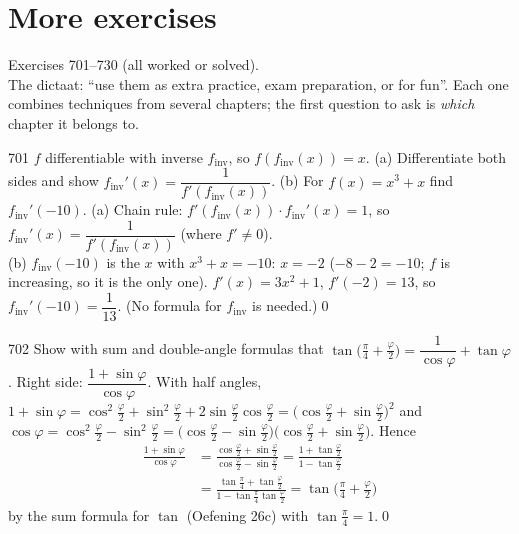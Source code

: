 \chapter{More exercises}
%
{Exercises 701--730 (all worked or solved).\\ The dictaat: ``use them as extra practice, exam preparation, or for fun''. Each one combines techniques from several chapters; the first question to ask is \emph{which} chapter it belongs to.}


\begin{bookex}{701}
$f$ differentiable with inverse $f_{\mathrm{inv}}$, so $f(f_{\mathrm{inv}}(x))=x$. (a) Differentiate both sides and show $f_{\mathrm{inv}}'(x)=\dfrac1{f'(f_{\mathrm{inv}}(x))}$. (b) For $f(x)=x^3+x$ find $f_{\mathrm{inv}}'(-10)$.
\solution
(a) Chain rule: $f'(f_{\mathrm{inv}}(x))\cdot f_{\mathrm{inv}}'(x)=1$, so $f_{\mathrm{inv}}'(x)=\dfrac1{f'(f_{\mathrm{inv}}(x))}$ (where $f'\ne0$).\\
(b) $f_{\mathrm{inv}}(-10)$ is the $x$ with $x^3+x=-10$: $x=-2$ ($-8-2=-10$; $f$ is increasing, so it is the only one). $f'(x)=3x^2+1$, $f'(-2)=13$, so $f_{\mathrm{inv}}'(-10)=\dfrac1{13}$. (No formula for $f_{\mathrm{inv}}$ is needed.)\qed
\end{bookex}

\begin{bookex}{702}
Show with sum and double-angle formulas that $\tan\big(\frac\pi4+\frac\varphi2\big)=\dfrac1{\cos\varphi}+\tan\varphi$.
\solution
Right side: $\dfrac{1+\sin\varphi}{\cos\varphi}$. With half angles, $1+\sin\varphi=\cos^2\frac\varphi2+\sin^2\frac\varphi2+2\sin\frac\varphi2\cos\frac\varphi2=\big(\cos\frac\varphi2+\sin\frac\varphi2\big)^2$ and $\cos\varphi=\cos^2\frac\varphi2-\sin^2\frac\varphi2=\big(\cos\frac\varphi2-\sin\frac\varphi2\big)\big(\cos\frac\varphi2+\sin\frac\varphi2\big)$. Hence
\begin{align*}
\frac{1+\sin\varphi}{\cos\varphi}&=\frac{\cos\frac\varphi2+\sin\frac\varphi2}{\cos\frac\varphi2-\sin\frac\varphi2}=\frac{1+\tan\frac\varphi2}{1-\tan\frac\varphi2}\\
&=\frac{\tan\frac\pi4+\tan\frac\varphi2}{1-\tan\frac\pi4\tan\frac\varphi2}=\tan\Big(\frac\pi4+\frac\varphi2\Big)
\end{align*}
by the sum formula for $\tan$ (Oefening 26c) with $\tan\frac\pi4=1$.\qed
\end{bookex}

